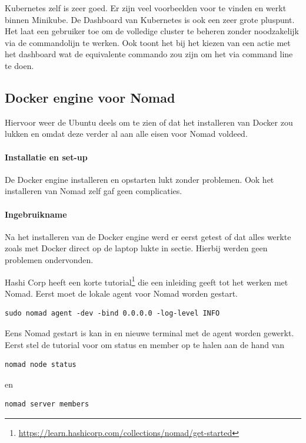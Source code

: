 Kubernetes zelf is zeer goed. Er zijn veel voorbeelden voor te vinden en werkt binnen Minikube. De Dashboard van Kubernetes is ook een zeer grote pluspunt. Het laat een gebruiker toe om de volledige cluster te beheren zonder noodzakelijk via de commandolijn te werken. Ook toont het bij het kiezen van een actie met het dashboard wat de equivalente commando zou zijn om het via command line te doen.


\subsection{Docker engine voor Nomad}
Hiervoor weer de Ubuntu deels om te zien of dat het installeren van Docker zou lukken en omdat deze verder al aan alle eisen voor Nomad voldeed.
\paragraph{Installatie en set-up}
De Docker engine installeren en opstarten lukt zonder problemen. Ook het installeren van Nomad zelf gaf geen complicaties.
\paragraph{Ingebruikname}
Na het installeren van de Docker engine werd er eerst getest of dat alles werkte zoals met Docker direct op de laptop lukte in sectie. Hierbij werden geen problemen ondervonden.

Hashi Corp heeft een korte tutorial\footnote{\url{https://learn.hashicorp.com/collections/nomad/get-started}} die een inleiding geeft tot het werken met Nomad. Eerst moet de lokale agent voor Nomad worden gestart.
\begin{verbatim}
sudo nomad agent -dev -bind 0.0.0.0 -log-level INFO
\end{verbatim}
Eens Nomad gestart is kan in en nieuwe terminal met de agent worden gewerkt. Eerst stel de tutorial voor om status en member op te halen aan de hand van
\begin{verbatim}
nomad node status
\end{verbatim}
en
\begin{verbatim}
nomad server members
\end{verbatim}

